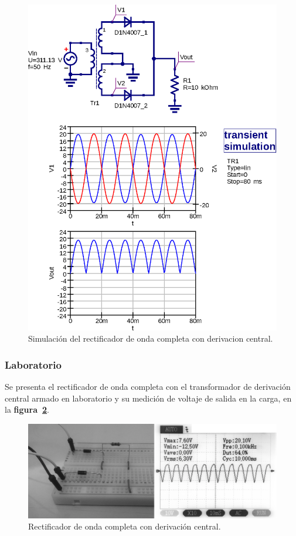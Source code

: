 \begin{figure}[!h]
\centering
\includegraphics[scale=0.75]{simulacion/03.derivacion_central1.eps}
\caption{Simulación del rectificador de onda completa con derivacion central.}
\label{simulacion03}
\end{figure}

\subsubsection{Laboratorio}
Se presenta el rectificador de onda completa con el transformador de derivación
central armado en laboratorio y su medición de voltaje de salida en la carga, en
la \textbf{figura~\ref{laboratorio05}}.

\begin{figure}[!h]
\centering
\includegraphics[scale=0.28]{fotos/03.derivacion_central1.eps}
\caption{Rectificador de onda completa con derivación central.}
\label{laboratorio05}
\end{figure}

